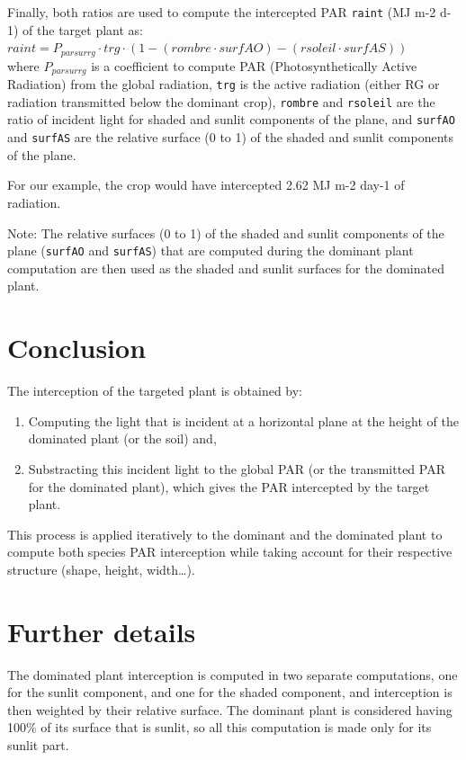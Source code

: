 \documentclass[]{book}
\providecommand{\tightlist}{%
  \setlength{\itemsep}{0pt}\setlength{\parskip}{0pt}}
\theoremstyle{definition}
\theoremstyle{definition}
\theoremstyle{definition}
\theoremstyle{remark}
\begin{document}
Finally, both ratios are used to compute the intercepted PAR
\texttt{raint} (MJ m-2 d-1) of the target plant as:\\
\(raint=P_{parsurrg}\cdot trg\cdot(1-(rombre\cdot surfAO)-(rsoleil\cdot surfAS))\)\\
where \(P_{parsurrg}\) is a coefficient to compute PAR
(Photosynthetically Active Radiation) from the global radiation,
\texttt{trg} is the active radiation (either RG or radiation transmitted
below the dominant crop), \texttt{rombre} and \texttt{rsoleil} are the
ratio of incident light for shaded and sunlit components of the plane,
and \texttt{surfAO} and \texttt{surfAS} are the relative surface (0 to
1) of the shaded and sunlit components of the plane.

For our example, the crop would have intercepted 2.62 MJ m-2 day-1 of
radiation.

Note: The relative surfaces (0 to 1) of the shaded and sunlit components
of the plane (\texttt{surfAO} and \texttt{surfAS}) that are computed
during the dominant plant computation are then used as the shaded and
sunlit surfaces for the dominated plant.

\section{Conclusion}\label{conclusion}

The interception of the targeted plant is obtained by:

\begin{enumerate}
\def\labelenumi{\arabic{enumi}.}
\tightlist
\item
  Computing the light that is incident at a horizontal plane at the
  height of the dominated plant (or the soil) and,
\item
  Substracting this incident light to the global PAR (or the transmitted
  PAR for the dominated plant), which gives the PAR intercepted by the
  target plant.
\end{enumerate}

This process is applied iteratively to the dominant and the dominated
plant to compute both species PAR interception while taking account for
their respective structure (shape, height, width\ldots{}).

\section{Further details}\label{further-details}

The dominated plant interception is computed in two separate
computations, one for the sunlit component, and one for the shaded
component, and interception is then weighted by their relative surface.
The dominant plant is considered having 100\% of its surface that is
sunlit, so all this computation is made only for its sunlit part.
\end{document}
